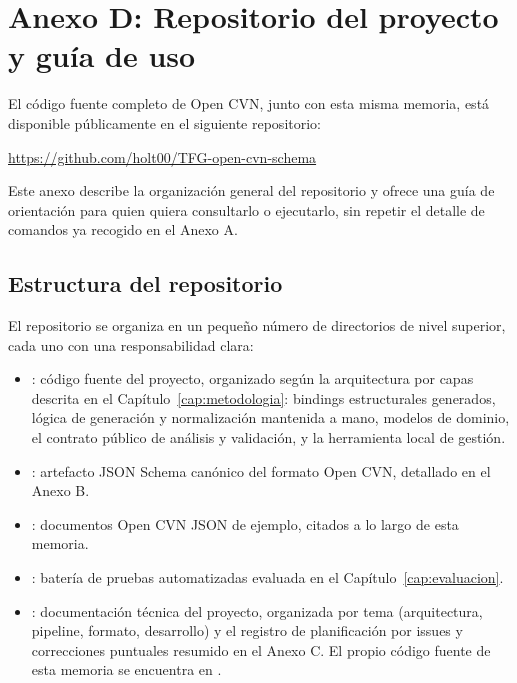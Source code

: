 \chapter*{Anexo D: Repositorio del proyecto y guía de uso}
\label{cap:anexo_repositorio}

El código fuente completo de Open CVN, junto con esta misma memoria, está
disponible públicamente en el siguiente repositorio:

\begin{center}
\url{https://github.com/holt00/TFG-open-cvn-schema}
\end{center}

Este anexo describe la organización general del repositorio y ofrece una
guía de orientación para quien quiera consultarlo o ejecutarlo, sin repetir
el detalle de comandos ya recogido en el Anexo A.

\section*{Estructura del repositorio}

El repositorio se organiza en un pequeño número de directorios de nivel
superior, cada uno con una responsabilidad clara:

\begin{itemize}
  \item {}: código fuente del proyecto, organizado según la
  arquitectura por capas descrita en el Capítulo~\ref{cap:metodologia}:
  bindings estructurales generados, lógica de generación y normalización
  mantenida a mano, modelos de dominio, el contrato público de análisis y
  validación, y la herramienta local de gestión.

  \item {}: artefacto JSON Schema canónico del formato Open CVN,
  detallado en el Anexo B.

  \item {}: documentos Open CVN JSON de ejemplo, citados a lo
  largo de esta memoria.

  \item {}: batería de pruebas automatizadas evaluada en el
  Capítulo~\ref{cap:evaluacion}.

  \item {}: documentación técnica del proyecto, organizada por
  tema (arquitectura, pipeline, formato, desarrollo) y el registro de
  planificación por issues y correcciones puntuales resumido en el Anexo C.
  El propio código fuente de esta memoria se encuentra en
  .
\end{itemize}


